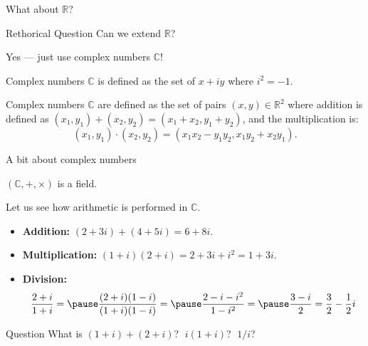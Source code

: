 \documentclass{beamer}
\begin{document}
    \begin{frame}{What about $\mathbb{R}$?}
        \begin{alertblock}{Rethorical Question}
           Can we extend $\mathbb{R}$?\pause
        \end{alertblock}

        Yes --- just use complex numbers $\mathbb{C}$!\pause

        \begin{definition}
            Complex numbers $\mathbb{C}$ is defined as the set of $x+iy$ where $i^2=-1$.\pause
        \end{definition}

        \begin{definition}
            Complex numbers $\mathbb{C}$ are defined as the set of pairs $(x,y) \in \mathbb{R}^2$ where addition is defined as $(x_1,y_1)+(x_2,y_2)=(x_1+x_2,y_1+y_2)$, and the multiplication is:
            \begin{equation*}
                (x_1,y_1) \cdot (x_2,y_2) = (x_1x_2-y_1y_2,x_1y_2+x_2y_1).
            \end{equation*}
        \end{definition}
    \end{frame}

    \begin{frame}{A bit about complex numbers}
        \begin{theorem}
            $(\mathbb{C},+,\times)$ is a field.\pause
        \end{theorem}

        \begin{example}
            Let us see how arithmetic is performed in $\mathbb{C}$.
            \begin{itemize}
                \item \textbf{Addition:} $(2+3i)+(4+5i)=6+8i$.\pause
                \item \textbf{Multiplication:} $(1+i)(2+i)=2+3i+i^2=1+3i$.\pause
                \item \textbf{Division:}
                \begin{equation*}
                    \frac{2+i}{1+i} =\pause \frac{(2+i)(1-i)}{(1+i)(1-i)} =\pause \frac{2-i-i^2}{1-i^2} =\pause \frac{3-i}{2} = \frac{3}{2} - \frac{1}{2}i
                \end{equation*}
            \end{itemize}
        \end{example}
        
        \begin{alertblock}{Question}
            \pause What is $(1+i)+(2+i)$? \pause $\;i(1+i)$? \pause  $\;1/i$?
        \end{alertblock}
    \end{frame}
\end{document}
